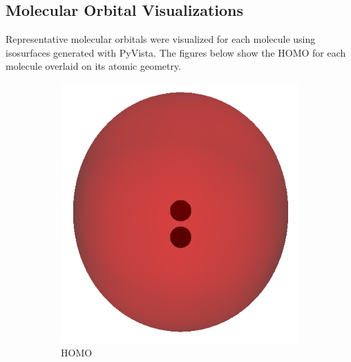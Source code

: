 \documentclass[12pt]{article}
\begin{document}
\subsection*{Molecular Orbital Visualizations}

Representative molecular orbitals were visualized for each molecule using isosurfaces generated with PyVista. The figures below show the HOMO for each molecule overlaid on its atomic geometry.

\begin{figure}[H]
    \centering
    \begin{subfigure}[b]{0.45\textwidth}
        \includegraphics[width=\textwidth]{figures/h2_homo.png}
        \caption{ HOMO}
    \end{subfigure}
    \hfill
    \begin{subfigure}[b]{0.45\textwidth}

\end{subfigure}
\end{figure}
\end{document}
